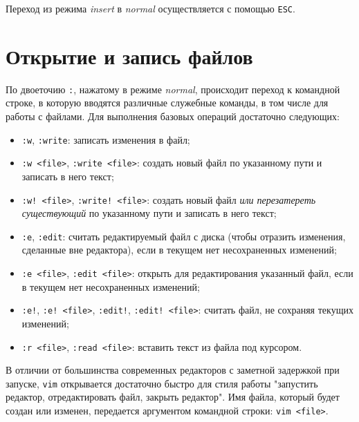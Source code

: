 \documentclass[listings]{labreport}
\begin{document}
Переход из режима \textit{insert} в \textit{normal} осуществляется с помощью
\texttt{ESC}.

\section*{Открытие и запись файлов}

По двоеточию \texttt{:}, нажатому в режиме \textit{normal}, происходит
переход к командной строке, в которую вводятся различные служебные команды,
в том числе для работы с файлами. Для выполнения базовых операций достаточно
следующих:

\begin{itemize}
\item \texttt{:w}, \texttt{:write}: записать изменения в файл;
\item \texttt{:w <file>}, \texttt{:write <file>}: создать новый файл
  по указанному пути и записать в него текст;
\item \texttt{:w! <file>}, \texttt{:write! <file>}: создать новый файл
  \textit{или перезатереть существующий} по указанному пути и записать в него текст;
\item \texttt{:e}, \texttt{:edit}: считать редактируемый файл с диска (чтобы
  отразить изменения, сделанные вне редактора), если в текущем нет несохраненных изменений;
\item \texttt{:e <file>}, \texttt{:edit <file>}: открыть для редактирования
  указанный файл, если в текущем нет несохраненных изменений;
\item \texttt{:e!}, \texttt{:e! <file>}, \texttt{:edit!}, \texttt{:edit! <file>}:
  считать файл, не сохраняя текущих изменений;
\item \texttt{:r <file>}, \texttt{:read <file>}: вставить текст из файла под курсором.
\end{itemize}

В отличии от большинства современных редакторов с заметной задержкой при запуске,
\texttt{vim} открывается достаточно быстро для стиля работы "запустить
редактор, отредактировать файл, закрыть редактор". Имя файла, который будет создан или изменен,
передается аргументом командной строки: \texttt{vim <file>}.
\end{document}

